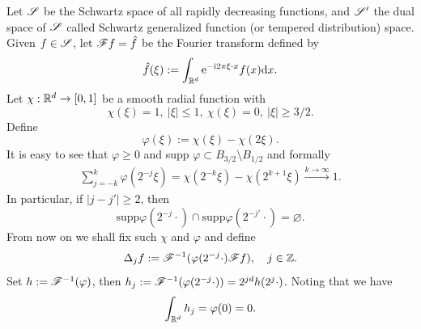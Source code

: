 Let ${\mathscr S}$ be the Schwartz space of all rapidly decreasing functions, and ${\mathscr S}'$ the dual space of ${\mathscr S}$ called Schwartz generalized function (or tempered distribution) space. Given $f\in{\mathscr S}$,
let ${\mathscr F} f=\hat f$  be the Fourier transform defined by
$$
    \hat f(\xi):=\int_{{\mathbb R}^d}\mathrm{e}^{-\mathrm{i}2\pi\xi\cdot x} f(x)\text{\rm{d}} x.
$$
Let $\chi:{\mathbb R}^d\to[0,1]$ be a smooth radial function with 
$$
\chi(\xi)=1,\ |\xi|\leq 1,\ \chi(\xi)=0,\ |\xi|\geq 3/2.
$$
Define
$$
\varphi(\xi):=\chi(\xi)-\chi(2\xi).
$$
It is easy to see that $\varphi\geq 0$ and supp $\varphi\subset B_{3/2}\setminus B_{1/2}$ and formally 
\begin{align}\label{EE1}
    \sum_{j=-k}^k\varphi(2^{-j}\xi)=\chi(2^{-k}\xi)-\chi(2^{k+1}\xi)\stackrel{k\to\infty}{\to} 1.
\end{align}
In particular, if $|j-j'|\geq 2$, then
$$
\mathrm{supp}\varphi(2^{-j}\cdot)\cap\mathrm{supp}\varphi(2^{-j'}\cdot)=\varnothing.
$$
From now on we shall fix such $\chi$ and $\varphi$ and define
$$
\Delta_j f:={\mathscr F}^{-1}(\varphi(2^{-j}\cdot) {\mathscr F} f), \quad j\in {\mathbb Z}.
$$
Set \(h:={\mathscr F}^{-1}(\varphi)\), then \(h_j := {\mathscr F}^{-1}(\varphi (2^{-j}\cdot))= 2^{jd} h(2^j \cdot)\). Noting that we have 
\[
    \int_{{\mathbb R}^d} h_j =\varphi(0)=0.  
\]
        
